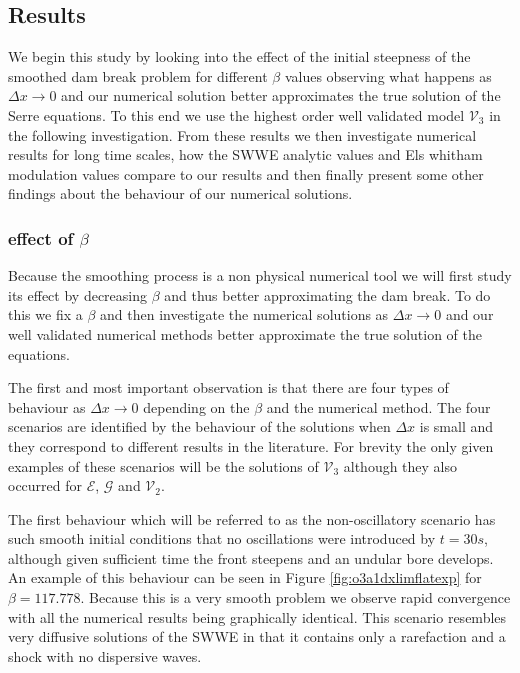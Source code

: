 \documentclass[SingleSpace,12pt,Proceedings]{Serre_ASCE}
\begin{document}



\subsection{Results}

We begin this study by looking into the effect of the initial steepness of the smoothed dam break problem for different $\beta$ values observing what happens as $\Delta x \rightarrow 0$ and our numerical solution better approximates the true solution of the Serre equations. To this end we use the highest order well validated model $\mathcal{V}_3$ in the following investigation. From these results we then investigate numerical results for long time scales, how the SWWE analytic values and Els whitham modulation values compare to our results and then finally present some other findings about the behaviour of our numerical solutions.

\subsubsection{effect of $\beta$}
Because the smoothing process is a non physical numerical tool we will first study its effect by decreasing $\beta$ and thus better approximating the dam break. To do this we fix a $\beta$ and then investigate the numerical solutions as $\Delta x \rightarrow 0$ and our well validated numerical methods better approximate the true solution of the equations. %

The first and most important observation is that there are four types of behaviour as $\Delta x \rightarrow 0$ depending on the $\beta$ and the numerical method. The four scenarios are identified by the behaviour of the solutions when $\Delta x$ is small and they correspond to different results in the literature. For brevity the only given examples of these scenarios will be the solutions of $\mathcal{V}_3$ although they also occurred for $\mathcal{E}$, $\mathcal{G}$ and $\mathcal{V}_2$.

The first behaviour which will be referred to as the non-oscillatory scenario has such smooth initial conditions that no oscillations were introduced by $t= 30s$, although given sufficient time the front steepens and an undular bore develops. An example of this behaviour can be seen in Figure \ref{fig:o3a1dxlimflatexp} for $\beta = 117.778$. Because this is a very smooth problem we observe rapid convergence with all the numerical results being graphically identical. This scenario resembles very diffusive solutions of the SWWE in that it contains only a rarefaction and a shock with no dispersive waves. 
\end{document}
